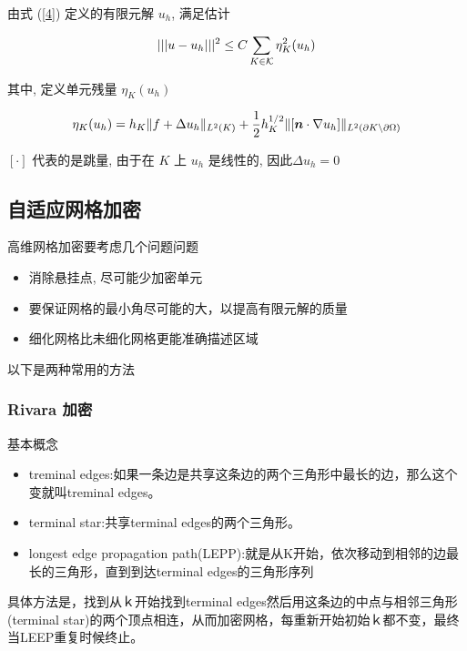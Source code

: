 \documentclass{article}
\begin{document}
\begin{theorem}[后验误差估计]
    由式 (\ref{4}) 定义的有限元解 $u_h$, 满足估计

    \begin{equation}
        ||| u - u_h |||^2 \le C \sum_{K\in {\mathcal K}} \eta_K^2(u_h)
    \end{equation}

    其中, 定义单元残量 $\eta_K(u_h)$ 

    \begin{equation}
        \eta_K(u_h) = h_K\|f + \Delta u_h\|_{L^2(K)}
                    + \frac{1}{2}h_K^{1/2}\|[{\boldsymbol n} \cdot \nabla
                    u_h]\|_{L^2(\partial K \setminus \partial \Omega)}
    \end{equation}

    $[\cdot]$ 代表的是跳量, 由于在 $K$ 上 $u_h$ 是线性的, 因此$\Delta u_h = 0$

\end{theorem}

\subsection{自适应网格加密}

高维网格加密要考虑几个问题问题

\begin{itemize}
    \item 消除悬挂点, 尽可能少加密单元
    \item 要保证网格的最小角尽可能的大，以提高有限元解的质量
    \item 细化网格比未细化网格更能准确描述区域
\end{itemize}

以下是两种常用的方法

\subsubsection{Rivara 加密}

基本概念
\begin{itemize}
\item treminal edges:如果一条边是共享这条边的两个三角形中最长的边，那么这个变就叫treminal edges。
\item terminal star:共享terminal edges的两个三角形。
\item longest edge propagation path(LEPP):就是从K开始，依次移动到相邻的边最长的三角形，直到到达terminal edges的三角形序列
\end{itemize}

具体方法是，找到从ｋ开始找到terminal edges然后用这条边的中点与相邻三角形(terminal star)的两个顶点相连，从而加密网格，每重新开始初始ｋ都不变，最终当LEEP重复时候终止。
\end{document}
